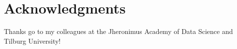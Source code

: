 \documentclass[nojss]{jss}\usepackage[]{graphicx}\usepackage[]{color}
\begin{document}
\section{Acknowledgments}

Thanks go to my colleagues at the Jheronimus Academy of Data Science and Tilburg University!

%

\end{document}
